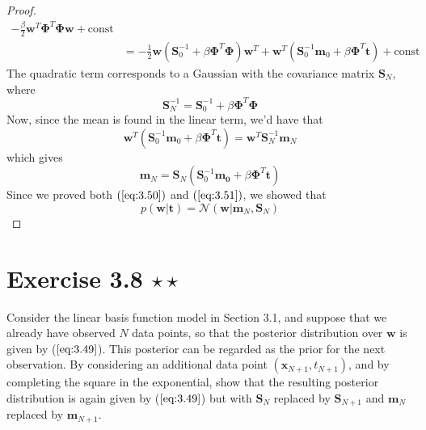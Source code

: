 \begin{proof}
\begin{align*}
            - \frac{\beta}{2} \mathbf{w}^T\mathbf{\Phi}^T\mathbf{\Phi}\mathbf{w} 
            + \text{const} \\
        &= -\frac{1}{2} \mathbf{w}(\mathbf{S}_0^{-1} + \beta \mathbf{\Phi}^T\mathbf{\Phi})\mathbf{w}^T
            + \mathbf{w}^T (\mathbf{S}_0^{-1}\mathbf{m}_0 + \beta\mathbf{\Phi}^T\mathbf{t})
            + \text{const}
    \end{align*}
    The quadratic term corresponds to a Gaussian with the covariance matrix $\mathbf{S}_N$, where
    \begin{equation*}
        \mathbf{S}_N^{-1} = \mathbf{S}_0^{-1} + \beta \mathbf{\Phi}^T\mathbf{\Phi}
        \tag{3.51}\label{eq:3.51}
    \end{equation*}
    Now, since the mean is found in the linear term, we'd have that
    \begin{equation*}
        \mathbf{w}^T(\mathbf{S}_0^{-1}\mathbf{m}_0 + \beta\mathbf{\Phi}^T\mathbf{t})
        = \mathbf{w}^T\mathbf{S}_N^{-1}\mathbf{m}_N
    \end{equation*}
    which gives
    \begin{equation*}
        \mathbf{m}_N = \mathbf{S}_N(\mathbf{S}_0^{-1}\mathbf{m_0} + \beta\mathbf{\Phi}^T\mathbf{t})
        \tag{3.50}\label{eq:3.50}
    \end{equation*}
    Since we proved both $(\ref{eq:3.50})$ and $(\ref{eq:3.51})$, we showed that
    \begin{equation*}
        p(\mathbf{w} | \mathbf{t}) = \mathcal{N}(\mathbf{w} | \mathbf{m}_N, \mathbf{S}_N)
        \tag{3.49}\label{eq:3.49}
    \end{equation*}
\end{proof}

\section*{Exercise 3.8 $\star \star$}
Consider the linear basis function model in Section 3.1, and suppose
that we already have observed $N$ data points, so that the posterior
distribution over $\mathbf{w}$ is given by ($\ref{eq:3.49}$). This posterior
can be regarded as the prior for the next observation. By considering an additional
data point $(\mathbf{x}_{N + 1}, t_{N + 1})$, and by completing the square in the
exponential, show that the resulting posterior distribution is again
given by ($\ref{eq:3.49}$) but with $\mathbf{S}_N$ replaced by $\mathbf{S}_{N + 1}$
and $\mathbf{m}_N$ replaced by $\mathbf{m}_{N + 1}$.

